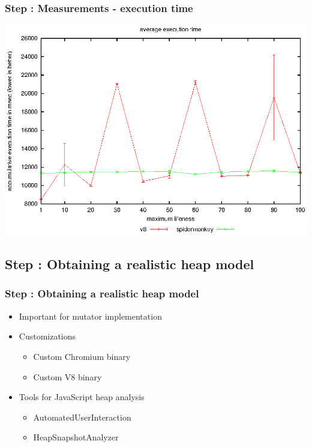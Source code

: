 \begin{frame} 
	\frametitle{Step \theStepCounter: Measurements - execution time}
	\begin{center}
		\includegraphics[width=.9\textwidth]{../plots/acdc_multi_exec_time.eps}
	\end{center}
\end{frame}
	
\subsection{Step \theStepCounter: Obtaining a realistic heap model}
\begin{frame}
	\frametitle{Step \theStepCounter: Obtaining a realistic heap model}
	\begin{itemize}
		\item Important for mutator implementation
		\item Customizations
		\begin{itemize}
			\item Custom Chromium binary
			\item Custom V8 binary
		\end{itemize}
			
		\pause
			
		\item Tools for JavaScript heap analysis
		\begin{itemize}
			\item AutomatedUserInteraction
			\item HeapSnapshotAnalyzer
		\end{itemize}
	\end{itemize}
\end{frame}
	
